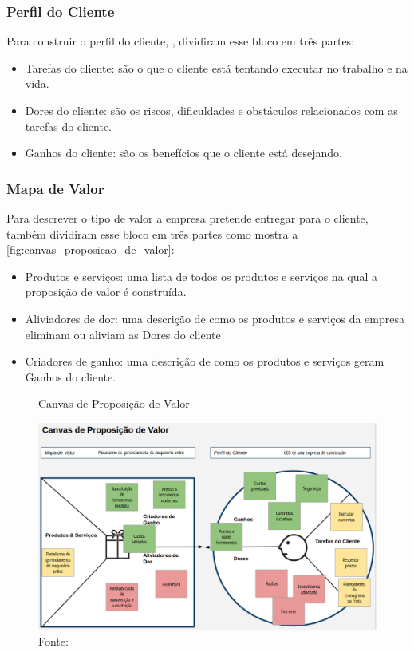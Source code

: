 \subsubsection{Perfil do Cliente}
\label{cha:perfil_do_cliente}
Para construir o perfil do cliente, , dividiram esse bloco em três partes:
\begin{itemize}
\item Tarefas do cliente: são o que o cliente está tentando executar no trabalho e na vida.
\item Dores do cliente: são os riscos, dificuldades e obstáculos relacionados com as tarefas do cliente.
\item Ganhos do cliente: são os benefícios que o cliente está desejando. \cite{valueproposition}
\end{itemize}

\subsubsection{Mapa de Valor}
\label{cha:mapa_de_valor}
Para descrever o tipo de valor a empresa pretende entregar para o cliente, também dividiram esse bloco em três partes como mostra a \autoref{fig:canvas_proposicao_de_valor}:
\begin{itemize}
\item Produtos e serviços: uma lista de todos os produtos e serviços na qual a proposição de valor é construída.
\item Aliviadores de dor: uma descrição de como os produtos e serviços da empresa eliminam ou aliviam as Dores do cliente
\item Criadores de ganho: uma descrição de como os produtos e serviços geram Ganhos do cliente. \cite{valueproposition}
\end{itemize}

\begin{figure}[H]
\caption{Canvas de Proposição de Valor}
\centerline{\includegraphics[scale=0.25]{img/canvas_proposicao_de_valor}}
\label{fig:canvas_proposicao_de_valor}
\caption* {Fonte: }
\end{figure}


